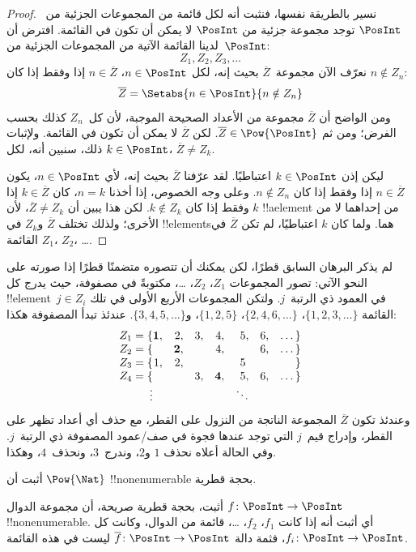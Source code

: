 \documentclass[../../../include/open-logic-section]{subfiles}
\begin{document}
\begin{proof}
نسير بالطريقة نفسها، فنثبت أنه لكل قائمة من المجموعات الجزئية
من~$\PosInt$ توجد مجموعة جزئية من $\PosInt$ لا يمكن أن تكون في القائمة.
افترض أن لدينا القائمة الآتية من المجموعات الجزئية من~$\PosInt$:
\[
Z_{1}, Z_{2}, Z_{3}, \dots
\]
نعرّف الآن مجموعة~$\overline{Z}$ بحيث إنه، لكل $n \in \PosInt$،
$n \in \overline{Z}$ إذا وفقط إذا كان $n \notin Z_{n}$:
\[
\overline{Z} = \Setabs{n \in \PosInt}{n \notin Z_n}
\]
ومن الواضح أن $\overline{Z}$ مجموعة من الأعداد الصحيحة الموجبة، لأن
كل~$Z_n$ كذلك بحسب الفرض؛ ومن ثم $\overline{Z} \in
\Pow{\PosInt}$. لكن $\overline{Z}$ لا يمكن أن تكون في القائمة. ولإثبات
ذلك، سنبين أنه، لكل $k \in \PosInt$، $\overline{Z} \neq
Z_k$.

ليكن إذن $k \in \PosInt$ اعتباطيًا. لقد عرّفنا $\overline{Z}$ بحيث
إنه، لأي $n \in \PosInt$، يكون $n \in \overline{Z}$ إذا وفقط إذا
كان $n \notin Z_n$. وعلى وجه الخصوص، إذا أخذنا $n=k$، كان
$k \in \overline{Z}$ إذا وفقط إذا كان $k \notin Z_k$. لكن هذا يبين
أن $\overline{Z} \neq Z_k$، لأن $k$ !!a{element} من إحداهما لا من
الأخرى؛ ولذلك تختلف $\overline{Z}$ و$Z_k$ في !!{element}sهما. ولما
كان $k$ اعتباطيًا، لم تكن $\overline{Z}$ في القائمة $Z_1$، $Z_2$،
\dots.
\end{proof}

\begin{explain}
لم يذكر البرهان السابق قطرًا، لكن يمكنك أن تتصوره متضمنًا قطرًا إذا
صورته على النحو الآتي: تصور المجموعات $Z_1$، $Z_2$، \dots، مكتوبةً
في مصفوفة، حيث يدرج كل !!{element}~$j \in Z_i$ في العمود ذي
الرتبة~$j$. ولتكن المجموعات الأربع الأولى في تلك القائمة
$\{1,2,3,\dots\}$، $\{2, 4, 6, \dots\}$، $\{1,2,5\}$،
و$\{3,4,5,\dots\}$. عندئذ تبدأ المصفوفة هكذا:
\[
\begin{array}{r@{}rrrrrrr}
  Z_1 = \{ & \mathbf{1}, & 2, & 3, & 4, & 5, & 6, & \dots\}\\
  Z_2 = \{ &  & \mathbf{2}, &  & 4, &  & 6, & \dots\}\\
  Z_3 = \{ & 1, & 2, &  &  & 5\phantom{,} &  & \}\\
  Z_4 = \{ &  &  & 3, & \mathbf{4}, & 5, & 6, & \dots\}\\
  \vdots & & & & & \ddots
\end{array}
\]
وعندئذ تكون $\overline{Z}$ المجموعة الناتجة من النزول على القطر، مع
حذف أي أعداد تظهر على القطر، وإدراج قيم~$j$ التي توجد عندها فجوة في
صف/عمود المصفوفة ذي الرتبة~$j$. وفي الحالة أعلاه نحذف $1$ و$2$،
وندرج~$3$، ونحذف~$4$، وهكذا.
\end{explain}

\begin{prob}
أثبت أن $\Pow{\Nat}$ !!{nonenumerable} بحجة قطرية.
\end{prob}

\begin{prob}\label{sfr:siz:nen:prob:f-posint}
أثبت، بحجة قطرية صريحة، أن مجموعة الدوال $f \colon \PosInt \to \PosInt$
!!{nonenumerable}. أي أثبت أنه إذا كانت $f_1$، $f_2$، \dots، قائمة
من الدوال، وكانت كل $f_i\colon
\PosInt \to \PosInt$، فثمة دالة $\overline{f}\colon \PosInt \to
\PosInt$ ليست في هذه القائمة.
\end{prob}
\end{document}
